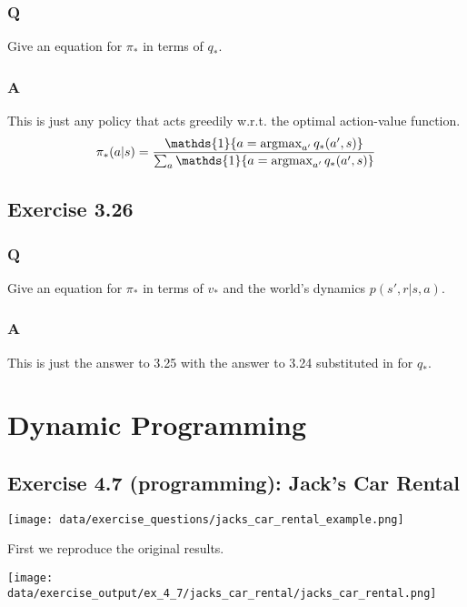 \subsubsection{Q}
Give an equation for $\pi_*$ in terms of $q_*$.

\subsubsection{A}
This is just any policy that acts greedily w.r.t. the optimal action-value function.
\begin{equation}
    \pi_* (a|s) = \frac{\mathds{1}\{a = \argmax_{a'} q_*(a', s)\}}{\sum_{a} \mathds{1}\{a = \argmax_{a'}q_*(a', s)\}}
\end{equation} 

\subsection{Exercise 3.26}
\subsubsection{Q}
Give an equation for $\pi_*$ in terms of $v_*$ and the world's dynamics $p(s', r| s, a)$.

\subsubsection{A}
This is just the answer to 3.25 with the answer to 3.24 substituted in for $q_*$.


\section{Dynamic Programming}


\subsection{Exercise 4.7 (programming): Jack's Car Rental}

\texttt{[image: data/exercise\_questions/jacks\_car\_rental\_example.png]}

First we reproduce the original results.

\texttt{[image: data/exercise\_output/ex\_4\_7/jacks\_car\_rental/jacks\_car\_rental.png]}

